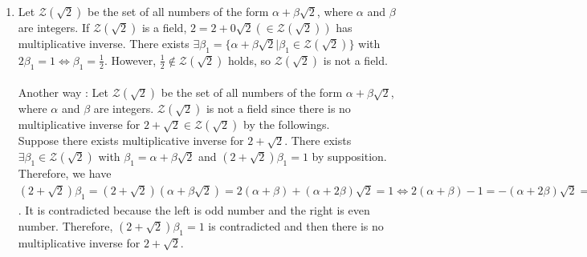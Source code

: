 \documentclass{article}
\theoremstyle{thmstyleone}
\theoremstyle{thmstyletwo}
\theoremstyle{thmstylethree}
\newcommand\Z{\mathcal Z}
\newcommand\Q{\mathcal Q}
\begin{document}
\begin{enumerate}[label = (\alph*)]
\begin{enumerate}[label=\arabic*)]
($\Q(\sqrt2)$ has multiplicative identity)
\item For all $\alpha_1 \in \Q(\sqrt2)$ with $\alpha_1 \ne 0$, put $\alpha_1 = a + b\sqrt2$ with $a,b \in \Q$. In this case, $a \ne 0$ or $b \ne 0$ holds by the followings.\\
``If $\alpha_1 = 0$, we have $\alpha_1 = a + b\sqrt2 = 0 \Leftrightarrow a = -b\sqrt2$. 
Therefore, $a = b = 0$ by $a,b \in \Q$.''\\
Let $\alpha''_1 = \dfrac{a}{a^2 - 2b^2} + \left(-\dfrac{b}{a^2 - 2b^2}\right)\sqrt2 \in \Q(\sqrt2)$. Note that we have $a^2 -2b^2 = (a + b\sqrt2)(a - b\sqrt2)$ and $a,b \in \Q$ with ($a \ne 0$ or $b \ne 0$), so we have $a + b\sqrt2 \ne 0$ and $a - b\sqrt2 \ne 0$, and then $a^2 -2b^2 \in \Q$ with $a^2 -2b^2 \ne 0$.
We have $\alpha_1\alpha''_1 = (a + b\sqrt2)\left(\dfrac{a}{a^2 - 2b^2} + \left(-\dfrac{b}{a^2 - 2b^2}\right)\sqrt2\right) = \dfrac{a^2 - ab\sqrt2 + ab\sqrt2 - 2b^2 }{a^2 - 2b^2} = 1$. 
Therefore, to every $\alpha_1 \in \Q(\sqrt2)$ with $\alpha_1 \ne 0$, there exists $\alpha''_1 \in \Q(\sqrt2)$ with $\alpha_1\alpha''_1 = 1$
\item $\alpha_1(\alpha_2 + \alpha_3) = \alpha_1\alpha_2 + \alpha_1\alpha_3$ (distributive law stands)
\end{enumerate}
from 1) to )9, $\Q(\sqrt2)$ is a field.
\item
Let $\Z(\sqrt2)$ be the set of all numbers of the form $\alpha + \beta\sqrt2$, where $\alpha$ and $\beta$ are integers. If $\Z(\sqrt2)$ is a field, $2 = 2 + 0\sqrt2 (\in \Z(\sqrt2))$ has multiplicative inverse. There exists $\exists\beta_1 = \{\alpha + \beta\sqrt2 |\beta_1 \in \Z(\sqrt2)\}$ with $2\beta_1 = 1 \iff \beta_1 = \frac{1}{2}$. However, $\frac{1}{2} \not\in \Z(\sqrt2)$ holds, so $\Z(\sqrt2)$ is not a field.\\\\
Another way : Let $\Z(\sqrt2)$ be the set of all numbers of the form $\alpha + \beta\sqrt2$, where $\alpha$ and $\beta$ are integers. 
$\Z(\sqrt2)$ is not a field since there is no multiplicative inverse for $2 + \sqrt2 \in \Z(\sqrt2)$ by the followings.\\
Suppose there exists multiplicative inverse for $2 + \sqrt2$.
There exists $\exists\beta_1 \in \Z(\sqrt2)$ with $\beta_1 = \alpha + \beta\sqrt2$ and $(2 + \sqrt2)\beta_1 = 1$ by supposition.
Therefore, we have $(2 + \sqrt2)\beta_1 = (2 + \sqrt2)(\alpha + \beta\sqrt2) = 2(\alpha + \beta) + (\alpha + 2\beta)\sqrt2 = 1 \iff 2(\alpha + \beta) - 1 = -(\alpha + 2\beta)\sqrt2 \implies 2(2(\alpha + \beta)^2 - 2(\alpha + \beta)) - 1 = 2(\alpha + 2\beta)^2$.
It is contradicted because the left is odd number and the right is even number.
Therefore, $(2 + \sqrt2)\beta_1 = 1$ is contradicted and then there is no multiplicative inverse for $2 + \sqrt2$.
\end{enumerate}
\end{document}
